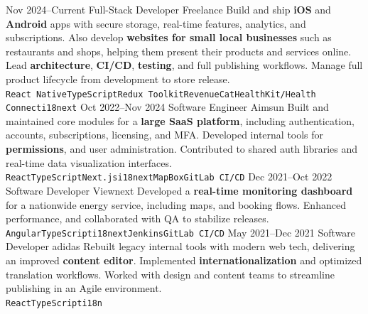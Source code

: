 \documentclass[9pt]{developercv} %
\begin{document}


\begin{entrylist}
	\entry
		{Nov 2024--Current}
		{Full-Stack Developer}
		{Freelance}
		{Build and ship \textbf{iOS} and \textbf{Android} apps with secure storage, real-time features, analytics, and subscriptions. Also develop \textbf{websites for small local businesses} such as restaurants and shops, helping them present their products and services online. Lead \textbf{architecture}, \textbf{CI/CD}, \textbf{testing}, and full publishing workflows. Manage full product lifecycle from development to store release. \\
        \texttt{React Native}\slashsep\texttt{TypeScript}\slashsep\texttt{Redux Toolkit}\slashsep\texttt{RevenueCat}\slashsep\texttt{HealthKit/Health Connect}\slashsep\texttt{i18next}}
	\entry
		{Oct 2022--Nov 2024}
		{Software Engineer}
		{Aimsun}
		{Built and maintained core modules for a \textbf{large SaaS platform}, including authentication, accounts, subscriptions, licensing, and MFA. Developed internal tools for \textbf{permissions}, and user administration. Contributed to shared auth libraries and real-time data visualization interfaces. \\
        \texttt{React}\slashsep\texttt{TypeScript}\slashsep\texttt{Next.js}\slashsep\texttt{i18next}\slashsep\texttt{MapBox}\slashsep\texttt{GitLab CI/CD}}
	\entry
		{Dec 2021--Oct 2022}
		{Software Developer}
		{Viewnext}
		{Developed a \textbf{real-time monitoring dashboard} for a nationwide energy service, including maps, and booking flows. Enhanced performance, and collaborated with QA to stabilize releases. \\
        \texttt{Angular}\slashsep\texttt{TypeScript}\slashsep\texttt{i18next}\slashsep\texttt{Jenkins}\slashsep\texttt{GitLab CI/CD}}
    \entry
		{May 2021--Dec 2021}
		{Software Developer}
		{adidas}
		{Rebuilt legacy internal tools with modern web tech, delivering an improved \textbf{content editor}. Implemented \textbf{internationalization} and optimized translation workflows. Worked with design and content teams to streamline publishing in an Agile environment. \\
        \texttt{React}\slashsep\texttt{TypeScript}\slashsep\texttt{i18n}}

\end{entrylist}
\end{document}

